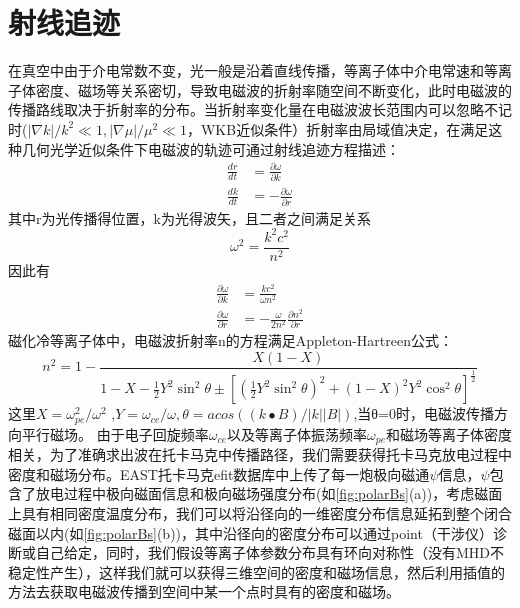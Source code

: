 \section{射线追迹}\label{sec:A4}
在真空中由于介电常数不变，光一般是沿着直线传播，等离子体中介电常速和等离子体密度、磁场等关系密切，导致电磁波的折射率随空间不断变化，此时电磁波的传播路线取决于折射率的分布。当折射率变化量在电磁波波长范围内可以忽略不记时($|∇k|/k^2 ≪1,|∇μ|/μ^2 ≪1$，WKB近似条件）折射率由局域值决定，在满足这种几何光学近似条件下电磁波的轨迹可通过射线追迹方程描述\cite{RN1958}：
\begin{equation}
\begin{aligned}
\frac{d r}{d t}&=\frac{\partial \omega}{\partial k} \\
\frac{d k}{d t}&=-\frac{\partial \omega}{\partial r}
\end{aligned}
\end{equation}
其中r为光传播得位置，k为光得波矢，且二者之间满足关系
\begin{equation}
\omega^{2}=\frac{k^{2} c^{2}}{n^{2}}
\end{equation}
因此有
\begin{align}
\frac{\partial \omega}{\partial k} & = \frac{k c^{2}}{\omega n^{2}}\\ \frac{\partial \omega}{\partial r} & = -\frac{\omega}{2 n^{2}} \frac{\partial n^{2}}{\partial r}
\end{align}
磁化冷等离子体中，电磁波折射率n的方程满足Appleton-Hartreen公式：
\begin{equation}
n^{2}=1-\frac{X(1-X)}{1-X-\frac{1}{2} Y^{2} \sin ^{2} \theta \pm\left[\left(\frac{1}{2} Y^{2} \sin ^{2} \theta\right)^{2}+(1-X)^{2} Y^{2} \cos ^{2} \theta\right]^{\frac{1}{2}}}
\end{equation}
这里$X=ω_{pe}^2/ω^2$ ,$Y=ω_{ce}/ω,θ=acos⁡((k∙B)/|k||B| )$,当θ=0时，电磁波传播方向平行磁场。
由于电子回旋频率$ω_{ce}$以及等离子体振荡频率$ω_{pe}$和磁场等离子体密度相关，为了准确求出波在托卡马克中传播路径，我们需要获得托卡马克放电过程中密度和磁场分布。EAST托卡马克efit数据库中上传了每一炮极向磁通$ψ$信息，$ψ$包含了放电过程中极向磁面信息和极向磁场强度分布(如\autoref{fig:polarBs}(a))，考虑磁面上具有相同密度温度分布，我们可以将沿径向的一维密度分布信息延拓到整个闭合磁面以内(如\autoref{fig:polarBs}(b))，其中沿径向的密度分布可以通过point（干涉仪）诊断或自己给定，同时，我们假设等离子体参数分布具有环向对称性（没有MHD不稳定性产生），这样我们就可以获得三维空间的密度和磁场信息，然后利用插值的方法去获取电磁波传播到空间中某一个点时具有的密度和磁场。

